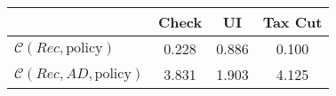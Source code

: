 \begin{tabular}{@{}lccc@{}} 
\toprule 
                          & Check      & UI    & Tax Cut    \\  \midrule 
$\mathcal{C}(Rec,\text{policy})$ & 0.228  & 0.886  & 0.100     \\ 
$\mathcal{C}(Rec, AD,\text{policy})$ & 3.831  & 1.903  & 4.125     \\ 
\end{tabular}  
